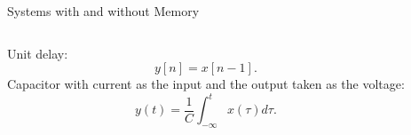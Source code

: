 \begin{frame}{Systems with and without Memory}
\begin{columns}
            Unit delay:
            \begin{equation*}
                y[n] = x[n-1].
            \end{equation*}
            Capacitor with current as the input and the output taken as the voltage:
            \begin{equation*}
                y(t) = \frac{1}{C}\int_{-\infty}^{t}x(\tau)d\tau.
            \end{equation*}
    \end{columns}
    \pause
    {
    }
\end{frame}


